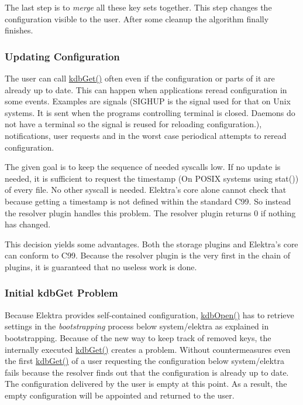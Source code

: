The last step is to {\itshape merge} all these key sets together. This step changes the configuration visible to the user. After some cleanup the algorithm finally finishes.

\subsubsection*{Updating Configuration}

The user can call {\ttfamily \hyperlink{group__kdb_ga28e385fd9cb7ccfe0b2f1ed2f62453a1}{kdb\+Get()}} often even if the configuration or parts of it are already up to date. This can happen when applications reread configuration in some events. Examples are signals (S\+I\+G\+H\+UP is the signal used for that on Unix systems. It is sent when the program\textquotesingle{}s controlling terminal is closed. Daemons do not have a terminal so the signal is reused for reloading configuration.), notifications, user requests and in the worst case periodical attempts to reread configuration.

The given goal is to keep the sequence of needed syscalls low. If no update is needed, it is sufficient to request the timestamp (On P\+O\+S\+IX systems using {\ttfamily stat()}) of every file. No other syscall is needed. Elektra’s core alone cannot check that because getting a timestamp is not defined within the standard C99. So instead the resolver plugin handles this problem. The resolver plugin returns 0 if nothing has changed.

This decision yields some advantages. Both the storage plugins and Elektra’s core can conform to C99. Because the resolver plugin is the very first in the chain of plugins, it is guaranteed that no useless work is done.

\subsubsection*{Initial kdb\+Get Problem}

Because Elektra provides self-\/contained configuration, {\ttfamily \hyperlink{group__kdb_ga6808defe5870f328dd17910aacbdc6ca}{kdb\+Open()}} has to retrieve settings in the {\itshape bootstrapping} process below {\ttfamily system/elektra} as explained in {\ttfamily bootstrapping}. Because of the new way to keep track of removed keys, the internally executed {\ttfamily \hyperlink{group__kdb_ga28e385fd9cb7ccfe0b2f1ed2f62453a1}{kdb\+Get()}} creates a problem. Without countermeasures even the first {\ttfamily \hyperlink{group__kdb_ga28e385fd9cb7ccfe0b2f1ed2f62453a1}{kdb\+Get()}} of a user requesting the configuration below {\ttfamily system/elektra} fails because the resolver finds out that the configuration is already up to date. The configuration delivered by the user is empty at this point. As a result, the empty configuration will be appointed and returned to the user.

